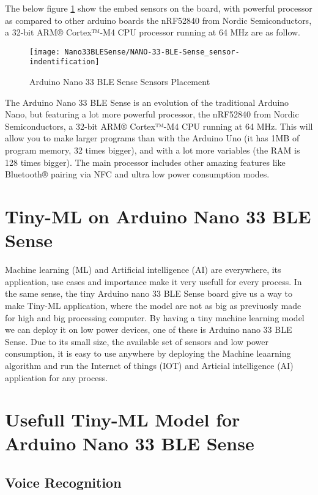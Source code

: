 The below figure \ref{Arduino Nano 33 BLE Sense Architecture} show the embed sensors on the board, with powerful processor as compared to other arduino boards the nRF52840 from Nordic Semiconductors, a 32-bit ARM® Cortex™-M4 CPU processor running at 64 MHz are as follow.

\begin{figure}[ht]
	\centering
	\texttt{[image: Nano33BLESense/NANO-33-BLE-Sense\_sensor-indentification]}
	\caption{Arduino Nano 33 BLE Sense Sensors Placement} 
	\label{Arduino Nano 33 BLE Sense Architecture}
\end{figure}

The Arduino Nano 33 BLE Sense is an evolution of the traditional Arduino Nano, but featuring a lot more powerful processor, the nRF52840 from Nordic Semiconductors, a 32-bit ARM® Cortex™-M4 CPU running at 64 MHz.\cite{ArduinoNano33:2021} This will allow you to make larger programs than with the Arduino Uno (it has 1MB of program memory, 32 times bigger), and with a lot more variables (the RAM is 128 times bigger). The main processor includes other amazing features like Bluetooth® pairing via NFC and ultra low power consumption modes.

\section{Tiny-ML on Arduino Nano 33 BLE Sense}

Machine learning (ML) and Artificial intelligence (AI) are everywhere, its application, use cases and importance make it very usefull for every process. In the same sense, the tiny Arduino nano 33 BLE Sense board give us a way to make Tiny-ML application, where the model are not as big as previuosly made for high and big processing computer. By having a tiny machine learning model we can deploy it on low power devices, one of these is Arduino nano 33 BLE Sense. Due to its small size, the available set of sensors and low power consumption, it is easy to use anywhere by deploying the Machine leaarning algorithm and run the Internet of things (IOT) and Articial intelligence (AI) application for any process.\cite{Dokic:2020}

\section{Usefull Tiny-ML Model for Arduino Nano 33 BLE Sense}

\subsection{Voice Recognition}

